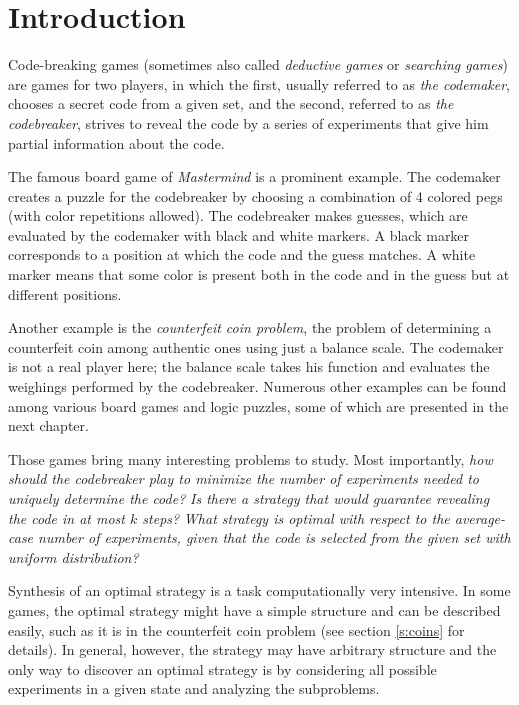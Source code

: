  \chapter{Introduction}


Code-breaking games (sometimes also called \emph{deductive games} or \emph{searching games})
are games for two players, in which the first, usually referred to as
\emph{the codemaker}, chooses a secret code from a given set, and the second,
referred to as \emph{the codebreaker}, strives to reveal the code by a series
of experiments that give him partial information about the code.

The famous board game of \emph{Mastermind} is a prominent example.
The codemaker creates a puzzle for the codebreaker by choosing a
combination of 4 colored pegs (with color repetitions allowed).
The codebreaker makes guesses, which are evaluated by the codemaker with
black and white markers.
A black marker corresponds to a position at which the code and the guess matches.
A white marker means that some color is present both in the code
  and in the guess but at different positions.

Another example is the \emph{counterfeit coin problem}, the problem of determining
  a counterfeit coin among authentic ones using just a balance scale.
The codemaker is not a real player here; the balance scale takes his function
  and evaluates the weighings performed by the codebreaker.
Numerous other examples can be found among various board games and logic puzzles,
 some of which are presented in the next chapter.

Those games bring many interesting problems to study.
Most importantly,
 \emph{how should the codebreaker play to minimize the number of experiments
   needed to uniquely determine the code?}
 \emph{Is there a strategy that would guarantee
   revealing the code in at most $k$ steps?}
 \emph{What strategy is optimal with respect
   to the average-case number of experiments,
   given that the code is selected
   from the given set with uniform distribution?}

Synthesis of an optimal strategy is a task computationally very intensive.
In some games, the optimal strategy might have a simple
  structure and can be described easily, such as it is in
  the counterfeit coin problem (see section \autoref{s:coins} for details).
In general, however, the strategy may have arbitrary structure and the only way
  to discover an optimal strategy is by considering all possible experiments
  in a given state and analyzing the subproblems.


